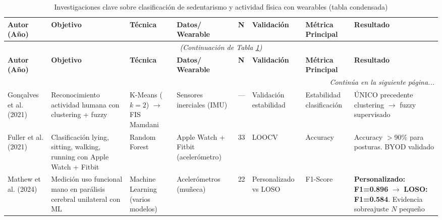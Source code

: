 \footnotesize
\begin{longtable}{@{}p{1.8cm}p{2.2cm}p{1.5cm}p{1.3cm}p{0.8cm}p{1.2cm}p{1.8cm}p{1.5cm}@{}}
\caption{Investigaciones clave sobre clasificación de sedentarismo y actividad física con wearables (tabla condensada)}
\label{tab:comparativa_investigaciones_condensada} \\
\toprule
\textbf{Autor (Año)} & 
\textbf{Objetivo} & 
\textbf{Técnica} & 
\textbf{Datos/ Wearable} & 
\textbf{N} & 
\textbf{Validación} & 
\textbf{Métrica Principal} & 
\textbf{Resultado} \\
\midrule
\endfirsthead

\multicolumn{8}{c}{\textit{(Continuación de Tabla \ref{tab:comparativa_investigaciones_condensada})}} \\
\toprule
\textbf{Autor (Año)} & 
\textbf{Objetivo} & 
\textbf{Técnica} & 
\textbf{Datos/ Wearable} & 
\textbf{N} & 
\textbf{Validación} & 
\textbf{Métrica Principal} & 
\textbf{Resultado} \\
\midrule
\endhead

\midrule
\multicolumn{8}{r}{\textit{Continúa en la siguiente página...}} \\
\endfoot

\bottomrule
\endlastfoot
        
        
        Gonçalves et al. (2021) \cite{Goncalves2021} & 
        Reconocimiento actividad humana con clustering + fuzzy & 
        K-Means ($k=2$) $\rightarrow$ FIS Mamdani & 
        Sensores inerciales (IMU) & 
        --- & 
        Validación estabilidad & 
        Estabilidad clasificación & 
        ÚNICO precedente clustering $\rightarrow$ fuzzy supervisado \\
        
        \midrule
        
        Fuller et al. (2021) \cite{Fuller2021Predicting} & 
        Clasificación lying, sitting, walking, running con Apple Watch + Fitbit & 
        Random Forest & 
        Apple Watch + Fitbit (acelerómetro) & 
        33 & 
        LOOCV & 
        Accuracy & 
        Accuracy $>$90\% para posturas. BYOD validado \\
        
        \midrule
        
        Mathew et al. (2024) \cite{Mathew2024LOSO} & 
        Medición uso funcional mano en parálisis cerebral unilateral con ML & 
        Machine Learning (varios modelos) & 
        Acelerómetros (muñeca) & 
        22 & 
        Personalizado vs LOSO & 
        F1-Score & 
        \textbf{Personalizado: F1=0.896} $\rightarrow$ \textbf{LOSO: F1=0.584}. Evidencia sobreajuste $N$ pequeño \\
        

\end{longtable}
